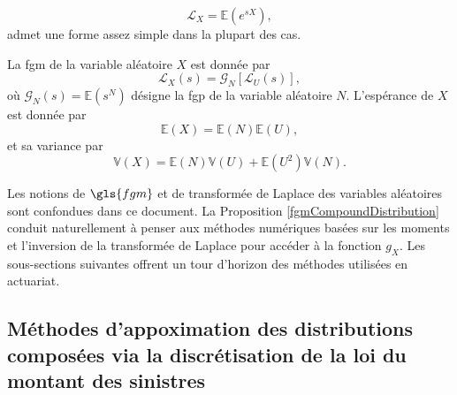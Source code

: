 \begin{equation}\label{fgmRVX}
\mathcal{L}_{X}=\mathbb{E}\left(e^{sX}\right),
\end{equation}
admet une forme assez simple dans la plupart des cas.
\begin{Prop}\label{fgmCompoundDistribution}
La \gls{fgm} de la variable aléatoire $X$ est donnée par 
\begin{equation}\label{fgmDsitributionComposee}
\mathcal{L}_{X}(s)=\mathcal{G}_{N}\left[\mathcal{L}_{U}(s)\right],
\end{equation}
où $\mathcal{G}_{N}(s)=\mathbb{E}\left(s^{N}\right)$ désigne la \gls{fgp} de la variable aléatoire $N$. L\rq{}espérance de $X$ est donnée par 
\begin{equation}\label{CompoundDistributionMean}
\mathbb{E}(X)=\mathbb{E}(N)\mathbb{E}(U),
\end{equation}
et sa variance par
\begin{equation*}
\mathbb{V}(X)=\mathbb{E}(N)\mathbb{V}(U)+\mathbb{E}\left(U^{2}\right)\mathbb{V}(N).
\end{equation*}
\end{Prop}
Les notions de $\gls{fgm}$ et de transformée de Laplace des variables aléatoires sont confondues dans ce document. La Proposition \ref{fgmCompoundDistribution} conduit naturellement à penser aux méthodes numériques basées sur les moments et l\rq{}inversion de la transformée de Laplace pour accéder à la fonction $g_{X}$. Les sous-sections suivantes offrent un tour d\rq{}horizon des méthodes utilisées en actuariat. 

\subsection{Méthodes d'appoximation des distributions composées via la discrétisation de la loi du montant des sinistres}\label{Chapter1Section1Subsection2}
